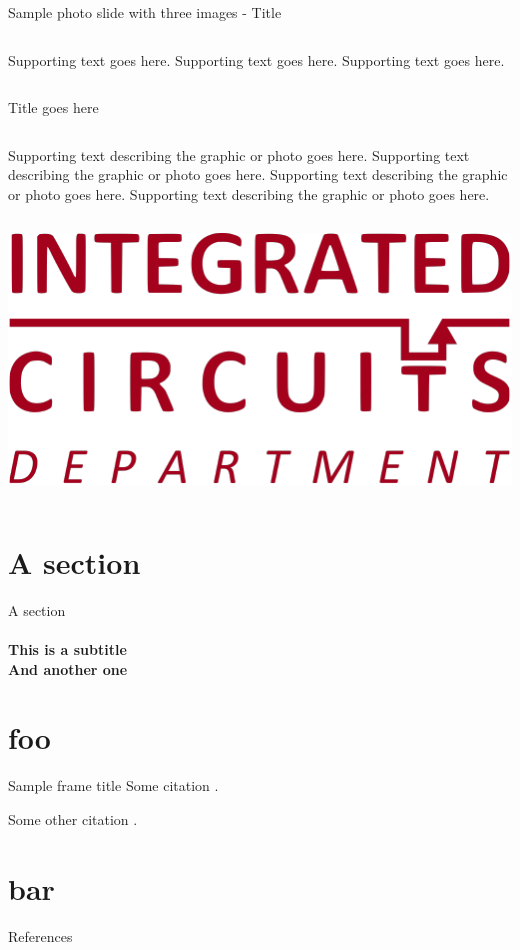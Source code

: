 \documentclass[aspectratio=169, t, 9pt]{beamer} %
\begin{document}
\begin{frame}{Sample photo slide with three images - Title}
\begin{groupcolumns}
\begin{column}{0.3\textwidth}

        Supporting text goes here. Supporting text goes here. Supporting text goes here.
    \end{column}
\end{groupcolumns}
\end{frame}


\begin{frame}{Title goes here}
\begin{groupcolumns}
    \begin{column}{0.4\textwidth}

        Supporting text describing the graphic or photo goes here. Supporting text describing the graphic or photo goes here. Supporting text describing the graphic or photo goes here. Supporting text describing the graphic or photo goes here.
    \end{column}
    \vspace{0.1\textwidth}
    \begin{column}{0.5\textwidth}
        \includegraphics[width=\textwidth]{./template/images/IC.pdf}%
    \end{column}
\end{groupcolumns}
\end{frame}


\section{A section}
\begin{frame}[SectionTitlepage]{A section}
    \framesubtitle{This is a subtitle \\ \vspace{6pt} And another one}
\end{frame}


\section{foo}
\begin{frame}{Sample frame title}
Some citation \cite{texbook}. 

Some other citation \cite{Shannon1948}.
\end{frame}


\section{bar}
\begin{frame}[allowframebreaks]{References}
    \printbibliography
\end{frame}
\end{document}

